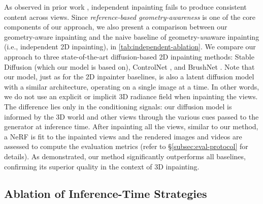 As observed in prior work \cite{weber2024nerfiller}, independent inpainting fails to produce consistent content across views.
Since \emph{reference-based geometry-awareness} is one of the core components of our approach, we also present a comparison between our geometry-aware inpainting and the naive baseline of geometry-\emph{un}aware inpainting (i.e., independent 2D inpainting), in \cref{tab:independent-ablation}.
We compare our approach to three state-of-the-art diffusion-based 2D inpainting methods: Stable Diffusion \cite{stable.diffusion} (which our model is based on), ControlNet \cite{zhang2023controlnet}, and BrushNet \cite{ju2024brushnet}.
Note that our model, just as for the 2D inpainter baselines, is also a latent diffusion model with a similar architecture, operating on a single image at a time. In other words, we do not use an explicit or implicit 3D radiance field when inpainting the views. The difference lies only in the conditioning signals: our diffusion model is informed by the 3D world and other views through the various cues passed to the generator at inference time.
After inpainting all the views, similar to our method, a NeRF is fit to the inpainted views and the rendered images and videos are assessed to compute the evaluation metrics (refer to \S\ref{subsec:eval-protocol} for details). As demonstrated, our method significantly outperforms all baselines, confirming its superior quality in the context of 3D inpainting.

\subsection{Ablation of Inference-Time Strategies}

